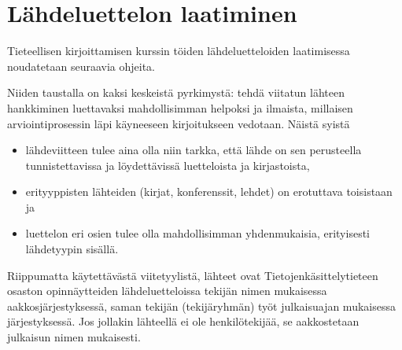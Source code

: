 \section{Lähdeluettelon laatiminen}

Tieteellisen kirjoittamisen kurssin töiden lähdeluetteloiden
laatimisessa noudatetaan seuraavia ohjeita.

Niiden taustalla on kaksi
keskeistä pyrkimystä: tehdä viitatun lähteen hankkiminen luettavaksi
mahdollisimman helpoksi ja ilmaista, millaisen arviointiprosessin
läpi käyneeseen kirjoitukseen vedotaan.
Näistä syistä
\begin{itemize}
\item lähdeviitteen tulee aina olla niin tarkka, että
lähde on sen perusteella tunnistettavissa ja löydettävissä luetteloista
ja kirjastoista,
\item erityyppisten lähteiden (kirjat, konferenssit, lehdet) on erotuttava
toisistaan
ja
\item luettelon eri osien tulee olla mahdollisimman
yhdenmukaisia, erityisesti lähdetyypin sisällä.
\end{itemize}


Riippumatta käytettävästä viitetyylistä, 
lähteet ovat Tietojenkäsittelytieteen osaston opinnäytteiden lähdeluetteloissa tekijän nimen mukaisessa aakkosjärjestyksessä,
saman tekijän (tekijäryhmän) työt julkaisuajan mukaisessa
järjestyksessä. Jos jollakin lähteellä ei ole henkilötekijää, se
aakkostetaan julkaisun nimen mukaisesti. 

